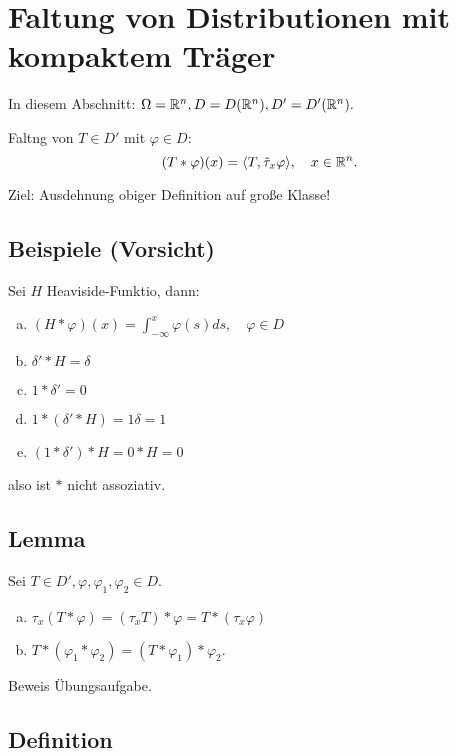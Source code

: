 \section{Faltung von Distributionen mit kompaktem Träger}

In diesem Abschnitt: $\Omega = \mathbb{R}^n, D = D(\mathbb{R}^n), D' = D'(\mathbb{R}^n).$

Faltng von $T \in D'$ mit $\varphi \in D$: 
$$
(T \ast \varphi)(x) = \langle T, \tilde\tau_x \varphi \rangle, \quad x \in \mathbb{R}^n.
$$

Ziel: Ausdehnung obiger Definition auf große Klasse!

\subsection{Beispiele (Vorsicht)}

Sei $H$ Heaviside-Funktio, dann:

\begin{enumerate}[a)]
  \item $(H \ast \varphi)(x) = \int_{-\infty}^x \varphi(s) ds, \quad \varphi \in D$
  \item $\delta' \ast H = \delta$
  \item $1 \ast \delta' = 0$
  \item $1 \ast (\delta' \ast H) = 1 \delta = 1$
  \item $(1 \ast \delta') \ast H = 0 \ast H = 0$
\end{enumerate}

also ist $\ast$ nicht assoziativ.

\subsection{Lemma}

Sei $T \in D', \varphi, \varphi_1, \varphi_2 \in D$.

\begin{enumerate}[a)]
  \item $\tau_x(T \ast \varphi) = (\tau_x T) \ast \varphi = T \ast (\tau_x \varphi)$
  \item $T \ast (\varphi_1 \ast \varphi_2) = (T \ast \varphi_1) \ast \varphi_2$.
\end{enumerate}

Beweis Übungsaufgabe.

\subsection{Definition}

